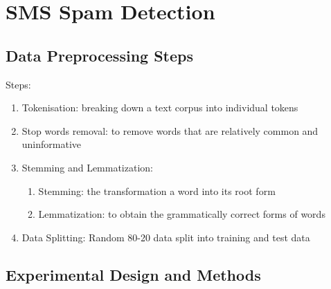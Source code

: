 \section{SMS Spam Detection}


\subsection{Data Preprocessing Steps}

Steps:
\begin{enumerate}
    \item Tokenisation: breaking down a text corpus into individual tokens
    \item Stop words removal: to remove words that are relatively common and uninformative
    \item Stemming and Lemmatization: 
    \begin{enumerate}
        \item Stemming: the transformation a word into its root form
        \item Lemmatization: to obtain the grammatically correct forms of words
    \end{enumerate}
    \item Data Splitting: Random 80-20 data split into training and test data
\end{enumerate}




\subsection{Experimental Design and Methods}

